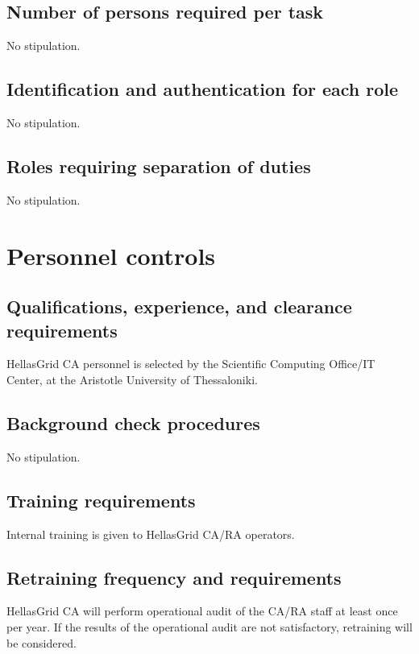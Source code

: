 \subsection{Number of persons required per task}

No stipulation.

\subsection{Identification and authentication for each role}

No stipulation.

\subsection{Roles requiring separation of duties}

No stipulation.

\section{Personnel controls}
\subsection{Qualifications, experience, and clearance requirements}

HellasGrid CA personnel is selected by the Scientific Computing Office/IT Center, at the  Aristotle University of Thessaloniki.

\subsection{Background check procedures}

No stipulation.

\subsection{Training requirements}

Internal training is given to HellasGrid CA/RA operators.

\subsection{Retraining frequency and requirements}
\label{sub:RetrainingFrequencyAndRequirements}

HellasGrid CA will perform operational audit of the CA/RA staff at least once per year. If the results of the operational audit are not satisfactory, retraining will be considered.

